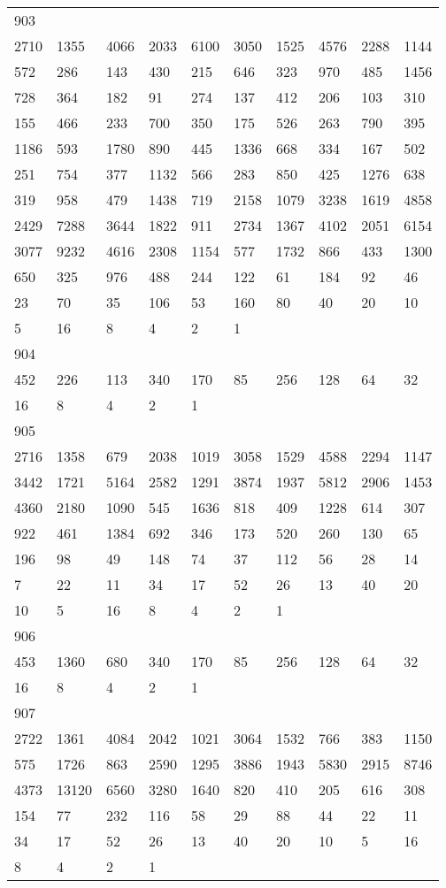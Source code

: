 \begin{longtable}{*{10}{l}}
903&&&&&&&&&\\
2710& 1355& 4066& 2033& 6100& 3050& 1525& 4576& 2288& 1144\\
572& 286& 143& 430& 215& 646& 323& 970& 485& 1456\\
728& 364& 182& 91& 274& 137& 412& 206& 103& 310\\
155& 466& 233& 700& 350& 175& 526& 263& 790& 395\\
1186& 593& 1780& 890& 445& 1336& 668& 334& 167& 502\\
251& 754& 377& 1132& 566& 283& 850& 425& 1276& 638\\
319& 958& 479& 1438& 719& 2158& 1079& 3238& 1619& 4858\\
2429& 7288& 3644& 1822& 911& 2734& 1367& 4102& 2051& 6154\\
3077& 9232& 4616& 2308& 1154& 577& 1732& 866& 433& 1300\\
650& 325& 976& 488& 244& 122& 61& 184& 92& 46\\
23& 70& 35& 106& 53& 160& 80& 40& 20& 10\\
5& 16& 8& 4& 2& 1& \\

904&&&&&&&&&\\
452& 226& 113& 340& 170& 85& 256& 128& 64& 32\\
16& 8& 4& 2& 1& \\

905&&&&&&&&&\\
2716& 1358& 679& 2038& 1019& 3058& 1529& 4588& 2294& 1147\\
3442& 1721& 5164& 2582& 1291& 3874& 1937& 5812& 2906& 1453\\
4360& 2180& 1090& 545& 1636& 818& 409& 1228& 614& 307\\
922& 461& 1384& 692& 346& 173& 520& 260& 130& 65\\
196& 98& 49& 148& 74& 37& 112& 56& 28& 14\\
7& 22& 11& 34& 17& 52& 26& 13& 40& 20\\
10& 5& 16& 8& 4& 2& 1& \\

906&&&&&&&&&\\
453& 1360& 680& 340& 170& 85& 256& 128& 64& 32\\
16& 8& 4& 2& 1& \\

907&&&&&&&&&\\
2722& 1361& 4084& 2042& 1021& 3064& 1532& 766& 383& 1150\\
575& 1726& 863& 2590& 1295& 3886& 1943& 5830& 2915& 8746\\
4373& 13120& 6560& 3280& 1640& 820& 410& 205& 616& 308\\
154& 77& 232& 116& 58& 29& 88& 44& 22& 11\\
34& 17& 52& 26& 13& 40& 20& 10& 5& 16\\
8& 4& 2& 1& \\


\end{longtable}
